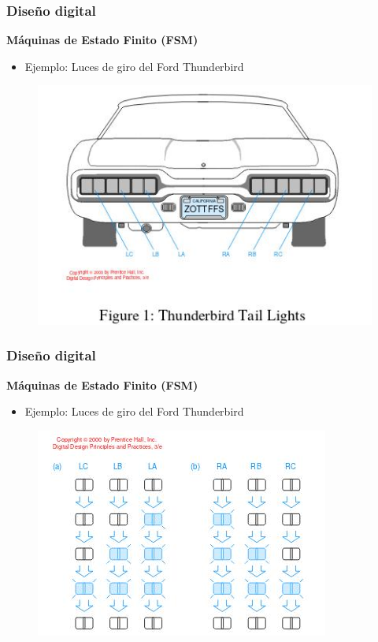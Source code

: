 \documentclass[aspectratio=169,compress]{beamer}
\begin{document}
\begin{footnotesize}
\begin{frame}[fragile]
\frametitle{Diseño digital}
\begin{center}\textbf{Máquinas de Estado Finito (FSM)}\end{center}
\begin{itemize}
\item Ejemplo: Luces de giro del Ford Thunderbird
\end{itemize}
\begin{figure}
\includegraphics[scale=0.4]{images/fsm2.jpg} 
\end{figure}
\end{frame}

\begin{frame}[fragile]
\frametitle{Diseño digital}
\begin{center}\textbf{Máquinas de Estado Finito (FSM)}\end{center}
\begin{itemize}
\item Ejemplo: Luces de giro del Ford Thunderbird
\end{itemize}
\begin{figure}
\includegraphics[scale=0.4]{images/fsm3.jpg} 
\end{figure}
\end{frame}


\end{footnotesize}
\end{document}
